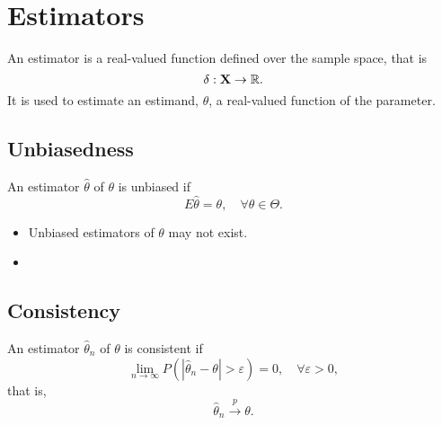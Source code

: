 \section{Estimators}

\begin{definition}[Estimator]\label{def:estimator}
	An estimator is a real-valued function defined over the sample space, that is
	\begin{equation}
		\delta:\textbf{X}\rightarrow\mathbb{R}.
	\end{equation}
	It is used to estimate an estimand, \(\theta\), a real-valued function of the parameter.
\end{definition}

\subsection*{Unbiasedness}

\begin{definition}[Unbiasedness]
	An estimator \(\hat{\theta}\) of \(\theta\) is unbiased if
	\begin{equation}
		E\hat{\theta}=\theta,\quad\forall\theta\in\Theta.
	\end{equation}
\end{definition}

\begin{remark}
	\begin{itemize}
		\item Unbiased estimators of \(\theta\) may not exist.
		\item
	\end{itemize}
\end{remark}

\begin{example}

\end{example}

\subsection*{Consistency}

\begin{definition}[Consistency]
	An estimator \(\hat{\theta}_n\) of \(\theta\) is consistent if
	\begin{equation}
		\lim_{n\rightarrow\infty}P\left(\left|\hat{\theta}_n-\theta\right|>\varepsilon\right)=0,\quad\forall\varepsilon>0,
	\end{equation}
	that is,
	\begin{equation}
		\hat{\theta}_{n}\stackrel{p}{\rightarrow}\theta.
	\end{equation}
\end{definition}

